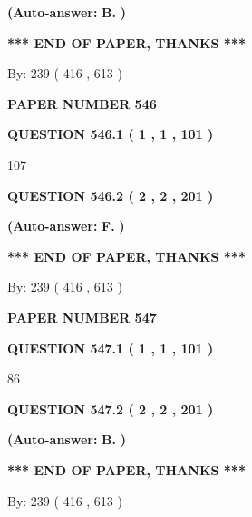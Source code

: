 \documentclass[12pt]{article}
\begin{document}
 
{\textbf{(Auto-answer:}}
{\textbf{\large{
B.}}}
{\textbf{)}}
 
 
   
   
   
   
\vspace{1.0in} 
{\textbf{\large{ *** END OF PAPER, THANKS *** }}} 
   
   
\hspace{1.0in} By: 
 239 ( 416 ,  613 )
   
   
   
   
\newpage 
\setcounter{page}{ 
   546001 } 
   
   
 {\textbf{ \Large{ PAPER NUMBER  546  }}}
   
   
   
   
  
  
{\textbf{\large{QUESTION
546.1 
 ( 1 , 1 , 101 )
}}}

107
  
  
{\textbf{\large{QUESTION
546.2 
 ( 2 , 2 , 201 )
}}}
 
 
{\textbf{(Auto-answer:}}
{\textbf{\large{
F.}}}
{\textbf{)}}
 
 
   
   
   
   
\vspace{1.0in} 
{\textbf{\large{ *** END OF PAPER, THANKS *** }}} 
   
   
\hspace{1.0in} By: 
 239 ( 416 ,  613 )
   
   
   
   
\newpage 
\setcounter{page}{ 
   547001 } 
   
   
 {\textbf{ \Large{ PAPER NUMBER  547  }}}
   
   
   
   
  
  
{\textbf{\large{QUESTION
547.1 
 ( 1 , 1 , 101 )
}}}

86
  
  
{\textbf{\large{QUESTION
547.2 
 ( 2 , 2 , 201 )
}}}
 
 
{\textbf{(Auto-answer:}}
{\textbf{\large{
B.}}}
{\textbf{)}}
 
 
   
   
   
   
\vspace{1.0in} 
{\textbf{\large{ *** END OF PAPER, THANKS *** }}} 
   
   
\hspace{1.0in} By: 
 239 ( 416 ,  613 )
   
   
   
\end{document}
